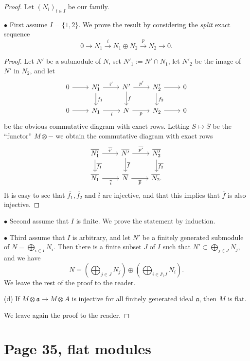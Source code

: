 \documentclass[12pt]{article}
\newcommand{\mf}{\mathfrak}
\newcommand{\aaa}{\mf a}
\newcommand{\bu}{\bullet}
\begin{document}
\begin{proof} 
Let $(N_i)_{i\in I}$ be our family. 

$\bu$ First assume $I=\{1,2\}$. We prove the result by considering the \emph{split} exact sequence 
$$
0\to N_1\xrightarrow i N_1\oplus N_2\xrightarrow pN_2\to0.
$$ 
\begin{proof}
Let $N'$ be a submodule of $N$, set $N'_1:=N'\cap N_1$, let $N'_2$ be the image of $N'$ in $N_2$, and let 
$$
\begin{tikzcd}
0\ar[r]&N'_1\ar[d,"f_1"]\ar[r,"i'"]&N'\ar[d,"f"]\ar[r,"p'"]&N'_2\ar[d,"f_2"]\ar[r]&0\\ 
0\ar[r]&N_1\ar[r,"i"']&N\ar[r,"p"']&N_2\ar[r]&0
\end{tikzcd}
$$  
be the obvious commutative diagram with exact rows. Letting $S\mapsto\overline S$ be the ``functor'' $M\otimes-$ we obtain the commutative diagram with exact rows
$$
\begin{tikzcd}
\overline{N'_1}\ar[d,"\overline{f_1}"]\ar[r,"\overline{i'}"]&\overline{N'}\ar[d,"\overline f"]\ar[r,"\overline{p'}"]& \overline{N'_2}\ar[d,"\overline{f_2}"]\\ 
\overline{N_1}\ar[r,"\overline i"']&\overline N\ar[r,"\overline p"']& \overline{N_2}.
\end{tikzcd}
$$ 
It is easy to see that $\overline{f_1},\overline{f_2}$ and $\overline i$ are injective, and that this implies that $\overline f$ is also injective.
\end{proof}

$\bu$ Second assume that $I$ is finite. We prove the statement by induction.

$\bu$ Third assume that $I$ is arbitrary, and let $N'$ be a finitely generated submodule of $N=\bigoplus_{i\in I}N_i$. Then there is a finite subset $J$ of $I$ such that $N'\subset\bigoplus_{j\in J}N_j$, and we have 
$$
N=\left(\bigoplus_{j\in J}N_j\right)\oplus\left(\bigoplus_{i\in I\setminus J}N_i\right). 
$$ 
We leave the rest of the proof to the reader.

(d) If $M\otimes\aaa\to M\otimes A$ is injective for all finitely generated ideal $\aaa$, then $M$ is flat.

We leave again the proof to the reader. 
\end{proof}

\section{Page 35, flat modules}%
\end{document}
